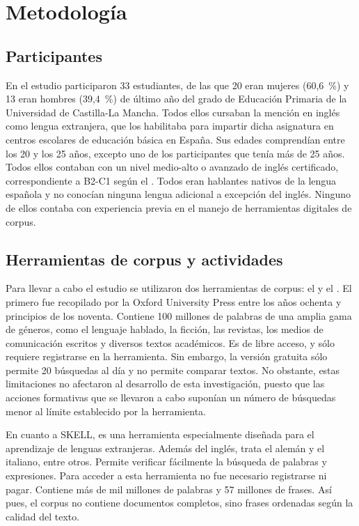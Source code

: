 \section{Metodología}\label{sec-metodología}
\subsection{Participantes}\label{sub-sec-participantes}

En el estudio participaron 33 estudiantes, de las que 20 eran mujeres
(60,6~\%) y 13 eran hombres (39,4~\%) de último año del grado de
Educación Primaria de la Universidad de Castilla-La Mancha. Todos ellos
cursaban la mención en inglés como lengua extranjera, que los habilitaba
para impartir dicha asignatura en centros escolares de educación básica
en España. Sus edades comprendían entre los 20 y los 25 años, excepto
uno de los participantes que tenía más de 25 años. Todos ellos contaban
con un nivel medio-alto o avanzado de inglés certificado,
correspondiente a B2-C1 según el \textcite{VolumencomplementariodelMarcoComúnEuropeodeReferenciaparalasLenguas}. Todos eran hablantes nativos de la lengua española y
no conocían ninguna lengua adicional a excepción del inglés. Ninguno de
ellos contaba con experiencia previa en el manejo de herramientas
digitales de corpus.
\subsection{Herramientas de corpus y actividades}\label{sub-sec-herramientasdecorpusyactividades}

Para llevar a cabo el estudio se utilizaron dos herramientas de corpus:
el \textcite{bnc2002} y el \textcite{sketchengine2018}. El primero fue recopilado por la
Oxford University Press entre los años ochenta y principios de los
noventa. Contiene 100 millones de palabras de una amplia gama de
géneros, como el lenguaje hablado, la ficción, las revistas, los medios
de comunicación escritos y diversos textos académicos. Es de libre
acceso, y sólo requiere registrarse en la herramienta. Sin embargo, la
versión gratuita sólo permite 20 búsquedas al día y no permite comparar
textos. No obstante, estas limitaciones no afectaron al desarrollo de
esta investigación, puesto que las acciones formativas que se llevaron a
cabo suponían un número de búsquedas menor al límite establecido por la
herramienta.

En cuanto a SKELL, es una herramienta especialmente diseñada para el
aprendizaje de lenguas extranjeras. Además del inglés, trata el alemán y
el italiano, entre otros. Permite verificar fácilmente la búsqueda de
palabras y expresiones. Para acceder a esta herramienta no fue necesario
registrarse ni pagar. Contiene más de mil millones de palabras y 57
millones de frases. Así pues, el corpus no contiene documentos
completos, sino frases ordenadas según la calidad del texto.


